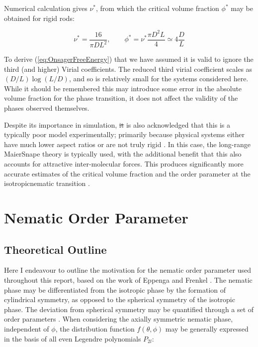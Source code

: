 \documentclass[11pt, a4paper]{article} %
\providecommand{\DIFadd}[1]{{\protect\color{blue}\uwave{#1}}} %
\providecommand{\DIFdel}[1]{{\protect\color{red}\sout{#1}}}                      %
\providecommand{\DIFaddbegin}{} %
\providecommand{\DIFaddend}{} %
\providecommand{\DIFdelbegin}{} %
\providecommand{\DIFdelend}{} %
\begin{document}
\begin{appendices}
Numerical calculation gives $\nu^{*}$, from which the critical volume fraction $\phi^{*}$ may be obtained for rigid rods:

\begin{equation}
\nu^{*} = \frac{16}{\pi D L^{2}}, \qquad \phi^{*} = \nu^{*} \frac{\pi D^{2} L}{4} \simeq 4 \frac{D}{L}
\end{equation}


To derive (\ref{eq:OnsagerFreeEnergy}) that we have assumed it is valid to ignore the third (and higher) Virial coefficients. The reduced third virial coefficient scales as $(D/L)\log(L/D)$, and so is relatively small for the systems considered here. While it should be remembered this may introduce some error in the absolute volume fraction for the phase transition, it does not affect the validity of the phases observed themselves.

Despite its importance in simulation, \DIFdelbegin \DIFdel{it }\DIFdelend \DIFaddbegin \DIFadd{tt }\DIFaddend is also acknowledged that this is a typically poor model experimentally; primarily because physical systems either have much lower aspect ratios or are not truly rigid \cite{Odijk1985}. In this case, the long-range Maier\textendash Snape theory \cite{Maier1959} is typically used, with the additional benefit that this also accounts for attractive inter-molecular forces. This produces significantly more accurate estimates of the critical volume fraction and the order parameter at the isotropic\textendash nematic transition \cite{Zannoni1979b}.

\section{Nematic Order Parameter} 
\subsection{Theoretical Outline}\label{sec:OrderParamTheory}
Here I endeavour to outline the motivation for the nematic order parameter used throughout this report, based on the work of Eppenga and Frenkel \cite{Eppenga1984, Frenkel1982}. The nematic phase may be differentiated from the isotropic phase by the formation of cylindrical symmetry, as opposed to the spherical symmetry of the isotropic phase. The deviation from spherical symmetry may be quantified through a set of order parameters \cite{Zannoni1979}. When considering the axially symmetric nematic phase, independent of $\phi$, the distribution function $f(\theta, \phi)$ may be generally expressed in the basis of all even Legendre polynomials $P_{2l}$:


\end{appendices}
\end{document}

